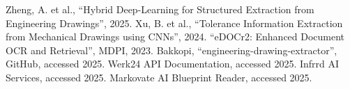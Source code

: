 \begin{thebibliography}{9}
 Zheng, A. et al., “Hybrid Deep-Learning for Structured Extraction from Engineering Drawings”, 2025.
 Xu, B. et al., “Tolerance Information Extraction from Mechanical Drawings using CNNs”, 2024.
 “eDOCr2: Enhanced Document OCR and Retrieval”, MDPI, 2023.
 Bakkopi, “engineering-drawing-extractor”, GitHub, accessed 2025.
 Werk24 API Documentation, accessed 2025.
 Infrrd AI Services, accessed 2025.
 Markovate AI Blueprint Reader, accessed 2025.
\end{thebibliography}